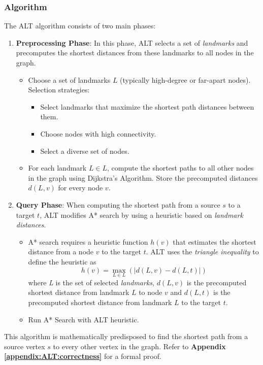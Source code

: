 		\subsubsection{Algorithm}
			The ALT algorithm consists of two main phases:
			\begin{enumerate}
				\item \textbf{Preprocessing Phase}: In this phase, ALT selects a set of \textit{landmarks} and precomputes the shortest distances from these landmarks to all nodes in the graph.
				\begin{itemize}
					\item Choose a set of landmarks $ \textit{L} $ (typically high-degree or far-apart nodes).  Selection strategies:
					\begin{itemize}
						\item Select landmarks that maximize the shortest path distances between them.
						\item Choose nodes with high connectivity.
						\item Select a diverse set of nodes.
					\end{itemize}
					\item For each landmark $ L \in \textit{L} $, compute the shortest paths to all other nodes in the graph using Dijkstra’s Algorithm. Store the precomputed distances $d(L, v)$ for every node $v$.
				\end{itemize}
				\item \textbf{Query Phase}: When computing the shortest path from a source $s$ to a target $t$, ALT modifies A* search by using a heuristic based on \textit{landmark distances}.
					\begin{itemize}
						\item A* search requires a heuristic function $ h(v) $ that estimates the shortest distance from a node $ v $ to the target $ t $. ALT uses the \textit{triangle inequality} to define the heuristic as
						\begin{equation*}
							h(v) = \max_{L \in \textit{L}} \left( \left| d(L, v) - d(L, t) \right| \right)
						\end{equation*}
						where \textit{L}  is the set of selected \textit{landmarks}, $d(L, v)$ is the precomputed shortest distance from landmark $L$ to node $v$ and $d(L, t)$ is the precomputed shortest distance from landmark $L$ to the target $t$.
						\item Run A* Search with ALT heuristic.
					\end{itemize}
			\end{enumerate}
			This algorithm is mathematically predisposed to find the shortest path from a source vertex $s$ to every other vertex in the graph.
			Refer to \textbf{ Appendix \ref{appendix:ALT:correctness}} for a formal proof.
